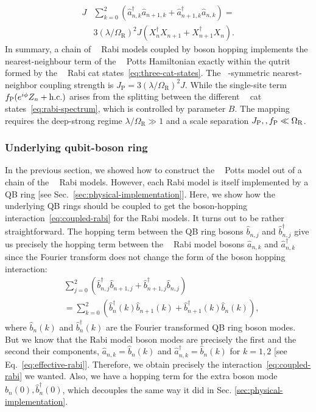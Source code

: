 \documentclass[reprint, aps, prx, amsmath, amssymb, longbibliography, superscriptaddress]{revtex4-2}
\DeclareMathOperator{\Zthree}{\mathbb{Z}_3}
\begin{document}
\begin{equation}
\begin{aligned}
    J &\sum\limits_{k=0}^{2} \left(\hat a_{n,k}^{\dagger} \hat a_{n+1,k} + \hat a_{n+1,k}^{\dagger} \hat a_{n,k}\right) = \\
    &3(\lambda/\Omega_{\textrm{R}})^2 J\left(X_n^{\dagger} X_{n+1} + X_{n+1}^{\dagger} X_n\right).
\end{aligned}
\end{equation}
In summary, a chain of $\Zthree$ Rabi models coupled by boson hopping implements the nearest-neighbour term of the $\Zthree$ Potts Hamiltonian exactly within the qutrit formed by the $\Zthree$ Rabi cat states~\eqref{eq:three-cat-states}. The $\Zthree$-symmetric nearest-neighbor coupling strength is $J_{\text{P}} = 3(\lambda/\Omega_{\textrm{R}})^2 J$. While the single-site term $f_{\text P}(e^{i\phi}Z_n+\text{h.c.})$ arises from the splitting between the different $\Zthree$ cat states~\eqref{eq:rabi-spectrum}, which is controlled by parameter $B$.  The mapping requires the deep-strong regime $\lambda/\Omega_{\mathrm R}\gg 1$ and a scale separation $J_{\text P},,f_{\text P}\ll \Omega_{\text{R}}$. 

\subsubsection{Underlying qubit-boson ring}
\label{sec:underlying-qb-ring}

In the previous section, we showed how to construct the $\Zthree$ Potts model out of a chain of the $\Zthree$ Rabi models. However, each Rabi model is itself implemented by a QB ring [see Sec.~\ref{sec:physical-implementation}]. Here, we show how the underlying QB rings should be coupled to get the boson-hopping interaction~\eqref{eq:coupled-rabi} for the Rabi models. It turns out to be rather straightforward. The hopping term between the QB ring bosons $\hat b_{n,j}$ and $\hat b_{n,j}^{\dagger}$ give us precisely the hopping term between the $\Zthree$ Rabi model bosons $\hat a_{n,k}$ and $\hat a_{n,k}^{\dagger}$ since the Fourier transform does not change the form of the boson hopping interaction:
\begin{equation}
\begin{aligned}
    &\sum\limits_{j=0}^2 \left(\hat b_{n,j}^{\dagger} \hat b_{n+1,j} + \hat b_{n+1,j}^{\dagger} \hat b_{n,j}\right) \\
    &=\sum\limits_{k=0}^{2} \left(\hat b_{n}^{\dagger}(k) \hat b_{n+1}(k) + \hat b_{n+1}^{\dagger}(k) \hat b_{n}(k)\right),
\end{aligned}
\end{equation}
where $\hat b_{n}(k)$ and $\hat b_n^{\dagger}(k)$ are the Fourier transformed QB ring boson modes. But we know that the Rabi model boson modes are precisely the first and the second their components, $\hat a_{n,k} = \hat b_n(k)$ and $\hat a_{n,k}^{\dagger} = \hat b_n(k)$ for $k =1,2$ [see Eq.~\eqref{eq:effective-rabi}]. Therefore, we obtain precisely the interaction~\eqref{eq:coupled-rabi} we wanted. Also, we have a hopping term for the extra boson mode $\hat b_{n}(0), \hat b^{\dagger}_{n}(0)$, which decouples the same way it did in Sec. \ref{sec:physical-implementation}.
\end{document}
